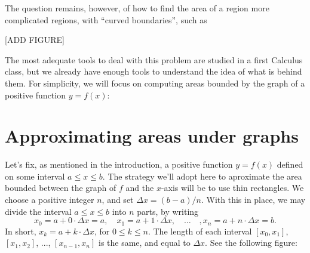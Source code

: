 \documentclass[nooutcomes]{ximera}
\begin{document}
The question remains, however, of how to find the area of a region more complicated regions, with ``curved boundaries'', such as

[ADD FIGURE]

The most adequate tools to deal with this problem are studied in a first Calculus class, but we already have enough tools to understand the idea of what is behind them. For simplicity, we will focus on computing areas bounded by the graph of a positive function $y=f(x)$:

 \begin{image}
\end{image}


\section{Approximating areas under graphs}

Let's fix, as mentioned in the introduction, a positive function $y=f(x)$ defined on some interval $a \leq x \leq b$. The strategy we'll adopt here to aproximate the area bounded between the graph of $f$ and the $x$-axis will be to use thin rectangles. We choose a positive integer $n$, and set $\Delta x = (b-a)/n$. With this in place, we may divide the interval $a\leq x \leq b$ into $n$ parts, by writing $$x_0 = a+0\cdot \Delta x = a, \quad x_1 = a+1\cdot \Delta x,\quad \ldots\quad, x_n = a + n\cdot \Delta x = b.$$In short, $x_k = a+k\cdot \Delta x$, for $0\leq k \leq n$. The length of each interval $[x_0,x_1]$, $[x_1,x_2]$, ..., $[x_{n-1},x_n]$ is the same, and equal to $\Delta x$. See the following figure:
\end{document}
